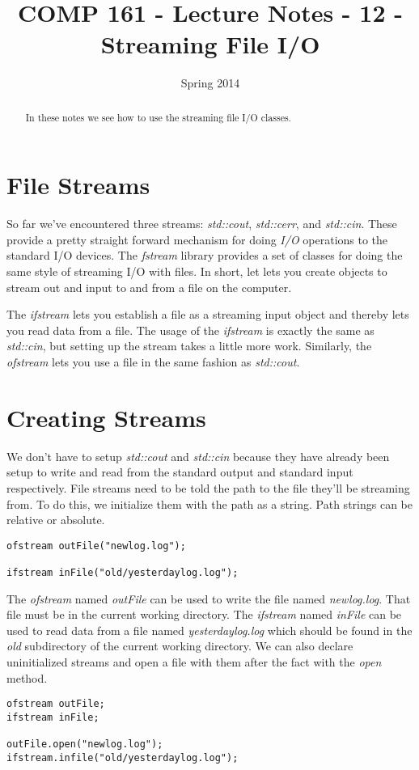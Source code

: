 \documentclass[]{tufte-handout}
\title{COMP 161 - Lecture Notes - 12 - Streaming File I/O}
\date{Spring 2014}
\begin{document}
 
\maketitle

\begin{abstract}
In these notes we see how to use the streaming file I/O classes. 
\end{abstract}

\section{File Streams}

So far we've encountered three streams: \textit{std::cout}, \textit{std::cerr}, and \textit{std::cin}.  These provide a pretty straight forward mechanism for doing \textit{I/O} operations to the standard I/O devices.  The \textit{fstream} library provides a set of classes for doing the same style of streaming I/O with files.  In short, let lets you create objects to stream out and input to and from a file on the computer.  

The \textit{ifstream} lets you establish a file as a streaming input object and thereby lets you read data from a file.  The usage of the \textit{ifstream} is exactly the same as \textit{std::cin}, but setting up the stream takes a little more work. Similarly, the \textit{ofstream} lets you use a file in the same fashion as \textit{std::cout}.

\section{Creating Streams}

We don't have to setup \textit{std::cout} and \textit{std::cin} because they have already been setup to write and read from the standard output and standard input respectively. File streams need to be told the path to the file they'll be streaming from.  To do this, we initialize them with the path as a string. Path strings can be relative or absolute.
\begin{verbatim}
ofstream outFile("newlog.log");

ifstream inFile("old/yesterdaylog.log");
\end{verbatim}
The \textit{ofstream} named \textit{outFile} can be used to write the file named \textit{newlog.log}.  That file must be in the current working directory. The \textit{ifstream} named \textit{inFile} can be used to read data from a file named \textit{yesterdaylog.log} which should be found in the \textit{old} subdirectory of the current working directory. We can also declare uninitialized streams and open a file with them after the fact with the \textit{open } method.
\begin{verbatim}
ofstream outFile;
ifstream inFile;

outFile.open("newlog.log");
ifstream.infile("old/yesterdaylog.log");
\end{verbatim}
\end{document}
